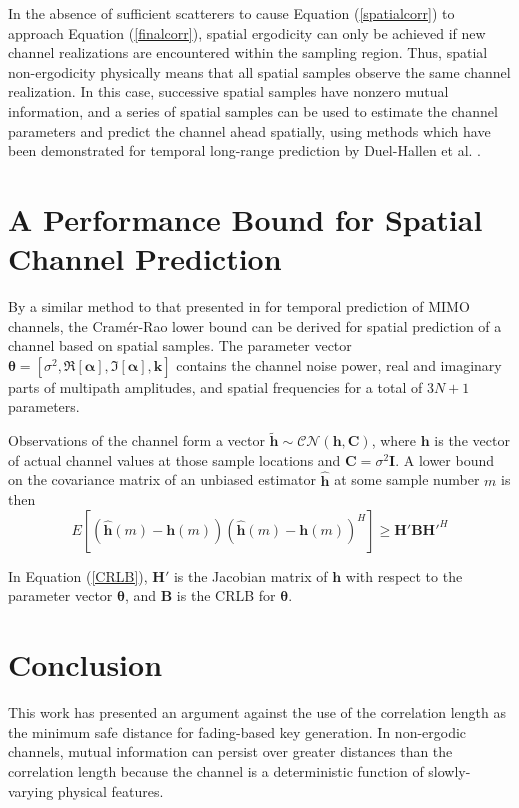 \documentclass[conference]{ieeetran}
\begin{document}
In the absence of sufficient scatterers to cause Equation (\ref{spatialcorr}) to approach Equation (\ref{finalcorr}), spatial ergodicity can only be achieved if new channel realizations are encountered within the sampling region.  Thus, spatial non-ergodicity physically means that all spatial samples observe the same channel realization.  In this case, successive spatial samples have nonzero mutual information, and a series of spatial samples can be used to estimate the channel parameters and predict the channel   ahead spatially, using methods which have been demonstrated for temporal long-range prediction by Duel-Hallen et al. \cite{duel-hallen2000}.
\section{A Performance Bound for Spatial Channel Prediction}%
By a similar method to that presented in \cite{svantesson2003} for temporal prediction of MIMO channels, the Cram\'er-Rao lower bound can be derived for spatial prediction of a channel based on spatial samples.  The parameter vector $\boldsymbol{\theta}= [\sigma^2, \Re[\boldsymbol{\alpha}], \Im[\boldsymbol{\alpha}], \mathbf{k}]$ contains the channel noise power, real and imaginary parts of multipath amplitudes, and spatial frequencies for a total of $3N+1$ parameters. 

Observations of the channel form a vector $\mathbf{\tilde{h}} \sim \mathcal{CN}(\mathbf{h}, \mathbf{C})$, where $\mathbf{h}$ is the vector of actual channel values at those sample locations and $\mathbf{C}=\sigma^2\mathbf{I}$. A lower bound on the covariance matrix of an unbiased estimator $\mathbf{\hat{h}}$ at some sample number $m$ is then
\begin{equation} \label{CRLB}
E\left[\left(\mathbf{\hat{h}}(m)-\mathbf{h}(m)\right)\left(\mathbf{\hat{h}}(m)-\mathbf{h}(m)\right)^H\right]\geq \mathbf{H'BH'}^H
\end{equation}

In Equation (\ref{CRLB}), $\mathbf{H'}$ is the Jacobian matrix of $\mathbf{h}$ with respect to the parameter vector $\boldsymbol{\theta}$,
and $\mathbf{B}$ is the CRLB for $\boldsymbol{\theta}$.

\section{Conclusion}
This work has presented an argument against the use of the correlation length as the minimum safe distance for fading-based key generation.  In non-ergodic channels, mutual information can persist over greater distances than the correlation length because the channel   is a deterministic function of slowly-varying physical features.

{}
\end{document}
